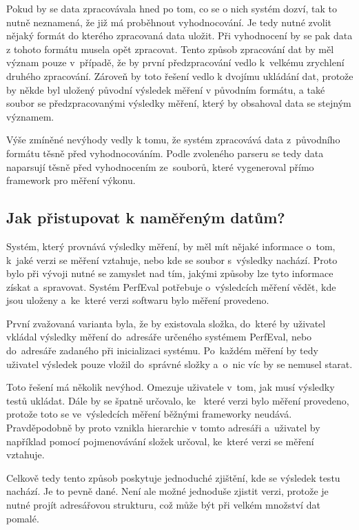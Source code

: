 Pokud by se data zpracovávala hned po tom, co se o nich systém dozví, tak to nutně neznamená,
že již má proběhnout vyhodnocování. Je tedy nutné zvolit nějaký formát do kterého zpracovaná data
uložit. Při vyhodnocení by se pak data z tohoto formátu musela opět zpracovat. Tento způsob
zpracování dat by měl význam pouze v~případě, že by první předzpracování vedlo k~velkému
zrychlení druhého zpracování. Zároveň by toto řešení vedlo k dvojímu ukládání dat, protože
by někde byl uložený původní výsledek měření v původním formátu, a také soubor se předzpracovanými
výsledky měření, který by obsahoval data se stejným významem.

Výše zmíněné nevýhody vedly k tomu, že systém zpracovává data z~původního formátu těsně před
vyhodnocováním. Podle zvoleného parseru se tedy data naparsují těsně před vyhodnocením ze~souborů,
které vygeneroval přímo framework pro měření výkonu.

\subsection{Jak přistupovat k naměřeným datům?}

Systém, který provnává výsledky měření, by měl mít nějaké informace o~tom, k~jaké verzi se měření vztahuje, nebo kde
se soubor s~výsledky nachází. Proto bylo při vývoji nutné se zamyslet nad tím, jakými způsoby lze tyto informace získat a~spravovat.
Systém PerfEval potřebuje o~výsledcích měření vědět, kde jsou uloženy a~ke~které verzi softwaru bylo měření provedeno.

První zvažovaná varianta byla, že by existovala složka, do~které by uživatel vkládal výsledky měření do~adresáře určeného
systémem PerfEval, nebo do~adresáře zadaného při inicializaci systému. Po~každém měření by tedy uživatel výsledek pouze
vložil do~správné složky a~o~nic víc by se nemusel starat.

Toto řešení má několik nevýhod. Omezuje uživatele v~tom, jak musí výsledky testů ukládat. Dále by se špatně určovalo, ke~
které verzi bylo měření provedeno, protože toto se ve~výsledcích měření běžnými frameworky neudává. Pravděpodobně by proto
vznikla hierarchie v tomto adresáři a~uživatel by například pomocí pojmenovávání složek určoval, ke~které verzi se měření vztahuje.

Celkově tedy tento způsob poskytuje jednoduché zjištění, kde se výsledek testu nachází. Je to pevně dané. Není ale možné jednoduše
zjistit verzi, protože je nutné projít adresářovou strukturu, což může být při velkém množství dat pomalé.

